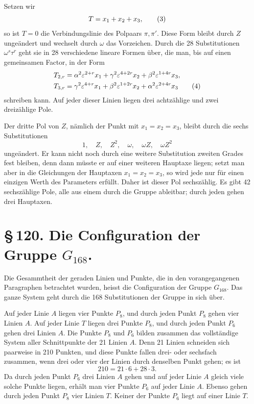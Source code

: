\documentclass[11pt]{article}
\providecommand{\eps}{\varepsilon}
\providecommand{\eps}{\varepsilon}
\begin{document}
Setzen wir
\begin{equation}
T=x_1+x_2+x_3,\notag
\tag{3}
\end{equation}
so ist \(T=0\) die Verbindungslinie des Polpaars \(\pi,\pi'\). Diese Form bleibt durch \(Z\) ungeändert und wechselt durch \(\omega\) das Vorzeichen. Durch die 28 Substitutionen \(\omega^s\tau^r\) geht sie in 28 verschiedene lineare Formen über, die man, bis auf einen gemeinsamen Factor, in der Form
\begin{align}
T_{2,r}&=\alpha^2\eps^{2+r}x_1+\gamma^2\eps^{4+2r}x_2+\beta^2\eps^{1+4r}x_3,\notag\\
T_{3,r}&=\gamma^2\eps^{4+r}x_1+\beta^2\eps^{1+2r}x_2+\alpha^2\eps^{2+4r}x_3
\tag{4}
\end{align}
schreiben kann. Auf jeder dieser Linien liegen drei achtzählige und zwei dreizählige Pole.

Der dritte Pol von \(Z\), nämlich der Punkt mit \(x_1=x_2=x_3\), bleibt durch die sechs Substitutionen
\begin{equation}
1,\quad Z,\quad Z^2,\quad \omega,\quad \omega Z,\quad \omega Z^2
\tag{5}
\end{equation}
ungeändert. Er kann nicht noch durch eine weitere Substitution zweiten Grades fest bleiben, denn dann müsste er auf einer weiteren Hauptaxe liegen; setzt man aber in die Gleichungen der Hauptaxen \(x_1=x_2=x_3\), so wird jede nur für einen einzigen Werth des Parameters erfüllt. Daher ist dieser Pol sechszählig. Es gibt 42 sechszählige Pole, alle aus einem durch die Gruppe ableitbar; durch jeden gehen drei Hauptaxen.

\section*{\S\,120. Die Configuration der Gruppe \(G_{168}\).}

Die Gesammtheit der geraden Linien und Punkte, die in den vorangegangenen Paragraphen betrachtet wurden, heisst die Configuration der Gruppe \(G_{168}\). Das ganze System geht durch die 168 Substitutionen der Gruppe in sich über.

Auf jeder Linie \(A\) liegen vier Punkte \(P_8\), und durch jeden Punkt \(P_8\) gehen vier Linien \(A\). Auf jeder Linie \(T\) liegen drei Punkte \(P_8\), und durch jeden Punkt \(P_6\) gehen drei Linien \(A\). Die Punkte \(P_8\) und \(P_6\) bilden zusammen das vollständige System aller Schnittpunkte der 21 Linien \(A\). Denn 21 Linien schneiden sich paarweise in 210 Punkten, und diese Punkte fallen drei- oder sechsfach zusammen, wenn drei oder vier der Linien durch denselben Punkt gehen; es ist
\begin{equation}
210=21\cdot6+28\cdot3.
\tag{1}
\end{equation}
Da durch jeden Punkt \(P_6\) drei Linien \(A\) gehen und auf jeder Linie \(A\) gleich viele solche Punkte liegen, erhält man vier Punkte \(P_6\) auf jeder Linie \(A\). Ebenso gehen durch jeden Punkt \(P_8\) vier Linien \(T\). Keiner der Punkte \(P_6\) liegt auf einer Linie \(T\).
\end{document}
